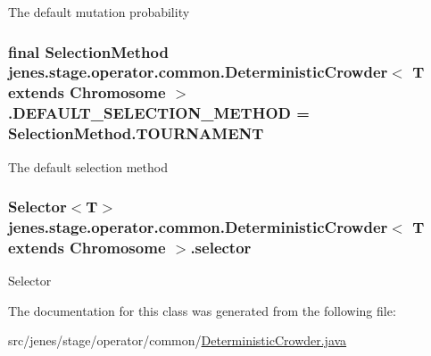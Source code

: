 The default mutation probability \hypertarget{classjenes_1_1stage_1_1operator_1_1common_1_1_deterministic_crowder_3_01_t_01extends_01_chromosome_01_4_a5ca3f3abce0f3163383ed9158b154289}{
\subsubsection[{D\-E\-F\-A\-U\-L\-T\-\_\-\-S\-E\-L\-E\-C\-T\-I\-O\-N\-\_\-\-M\-E\-T\-H\-O\-D}]{\setlength{\rightskip}{0pt plus 5cm}final Selection\-Method jenes.\-stage.\-operator.\-common.\-Deterministic\-Crowder$<$ T extends Chromosome $>$.D\-E\-F\-A\-U\-L\-T\-\_\-\-S\-E\-L\-E\-C\-T\-I\-O\-N\-\_\-\-M\-E\-T\-H\-O\-D = {\bf Selection\-Method.\-T\-O\-U\-R\-N\-A\-M\-E\-N\-T}\hspace{0.3cm}{\ttfamily [static]}}}\label{classjenes_1_1stage_1_1operator_1_1common_1_1_deterministic_crowder_3_01_t_01extends_01_chromosome_01_4_a5ca3f3abce0f3163383ed9158b154289}
The default selection method \hypertarget{classjenes_1_1stage_1_1operator_1_1common_1_1_deterministic_crowder_3_01_t_01extends_01_chromosome_01_4_a741955421216546663d52fd901c75649}{
\subsubsection[{selector}]{\setlength{\rightskip}{0pt plus 5cm}Selector$<$T$>$ jenes.\-stage.\-operator.\-common.\-Deterministic\-Crowder$<$ T extends Chromosome $>$.selector\hspace{0.3cm}{\ttfamily [private]}}}\label{classjenes_1_1stage_1_1operator_1_1common_1_1_deterministic_crowder_3_01_t_01extends_01_chromosome_01_4_a741955421216546663d52fd901c75649}
Selector 

The documentation for this class was generated from the following file\-:\begin{DoxyCompactItemize}
\item 
src/jenes/stage/operator/common/\hyperlink{_deterministic_crowder_8java}{Deterministic\-Crowder.\-java}\end{DoxyCompactItemize}
